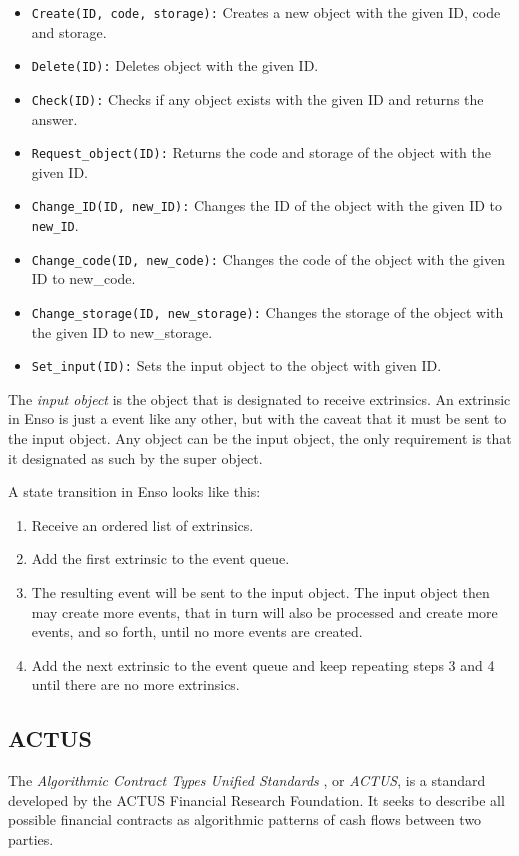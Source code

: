 \documentclass[conference]{IEEEtran}
\begin{document}
\begin{itemize}
	\item \texttt{Create(ID, code, storage):} Creates a new object with the given ID, code and storage.
	\item \texttt{Delete(ID):} Deletes object with the given ID.
	\item \texttt{Check(ID):} Checks if any object exists with the given ID and returns the answer.
	\item \texttt{Request\_object(ID):} Returns the code and storage of the object with the given ID.
	\item \texttt{Change\_ID(ID, new\_ID):} Changes the ID of the object with the given ID to \texttt{new\_ID}.
	\item \texttt{Change\_code(ID, new\_code):} Changes the code of the object with the given ID to new\_code.
	\item \texttt{Change\_storage(ID, new\_storage):} Changes the storage of the object with the given ID to new\_storage.
	\item \texttt{Set\_input(ID):} Sets the input object to the object with given ID.
\end{itemize}

The \textit{input object} is the object that is designated to receive extrinsics. An extrinsic in Enso is just a event like any other, but with the caveat that it must be sent to the input object. Any object can be the input object, the only requirement is that it designated as such by the super object.

A state transition in Enso looks like this:

\begin{enumerate}
	\item Receive an ordered list of extrinsics.
	\item Add the first extrinsic to the event queue.
	\item The resulting event will be sent to the input object. The input object then may create more events, that in turn will also be processed and create more events, and so forth, until no more events are created.
	\item Add the next extrinsic to the event queue and keep repeating steps 3 and 4 until there are no more extrinsics.
\end{enumerate}

\subsection{ACTUS}
The \textit{Algorithmic Contract Types Unified Standards} \cite{bundi2018actus}, or \textit{ACTUS}, is a standard developed by the ACTUS Financial Research Foundation. It seeks to describe all possible financial contracts as algorithmic patterns of cash flows between two parties.
\end{document}
